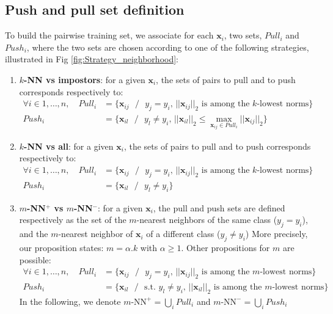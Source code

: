 \subsection{Push and pull set definition}
To build the pairwise training set, we associate for each $\textbf{x}_i$, two sets, $Pull_i$ and $Push_i$, where the two sets are chosen according to one of the following strategies, illustrated in Fig \ref{fig:Strategy_neighborhood}: 
\begin{enumerate}
	\item \textbf{$k$-NN vs impostors}: for a given $\textbf{x}_i$, the sets of pairs to pull and to push corresponds respectively to:
	\begin{align}
		\forall i\in 1, \ldots, n, \quad Pull_i & = \{\textbf{x}_{ij} \text{ } / \text{ }  \text{$y_j = y_i$, $||\textbf{x}_{ij}||_2$ is among the $k$-lowest norms} \} \label{eq:pull1}\\
		Push_i & = \{\textbf{x}_{il} \text{ } / \text{ } \text{$y_l \neq y_i$, } ||\textbf{x}_{il}||_2 \leq \max\limits_{\textbf{x}_{ij} \in Pull_i} ||\textbf{x}_{ij}||_2\} \label{eq:push1}
	\end{align}
	\item \textbf{$k$-NN vs all}: for a given $\textbf{x}_i$, the sets of pairs to pull and to push corresponds respectively to:	
	\begin{align}
	\forall i\in 1, \ldots, n, \quad Pull_i & = \{\textbf{x}_{ij} \text{ } / \text{ } \text{$y_j = y_i$, $||\textbf{x}_{ij}||_2$ is among the $k$-lowest norms} \} \\
	Push_i & = \{\textbf{x}_{il} \text{ } / \text{ } \text{$y_l \neq y_i$} \}
	\end{align}
	\item \textbf{$m$-NN$^+$ vs $m$-NN$^-$}: for a given $\textbf{x}_i$, the pull and push sets are defined respectively as 
	the set of the $m$-nearest neighbors of the same class ($y_j=y_i$), 
	and the $m$-nearest neighbor of $\textbf{x}_i$ of a different class ($y_j \neq y_i$)
	More precisely, our proposition states: $m=\alpha.k$ with $\alpha \geq 1$. Other propositions for $m$ are possible:
	\begin{align}
	\forall i\in 1, \ldots, n, \quad Pull_i & = \{\textbf{x}_{ij} \text{ } / \text{ } \text{$y_j = y_i$, $||\textbf{x}_{ij}||_2$ is among the $m$-lowest norms} \} \label{eq:mnn+}\\
	Push_i & = \{\textbf{x}_{il} \text{ } / \text{ } \text{s.t. $y_l \neq y_i$, $||\textbf{x}_{il}||_2$ is among the $m$-lowest norms} \} \label{eq:mnn-}
	\end{align}
	In the following, we denote $m\text{-NN}^+ = \bigcup\limits_{i} Pull_i$ and $m\text{-NN}^- = \bigcup\limits_{i} Push_i$
\end{enumerate}
